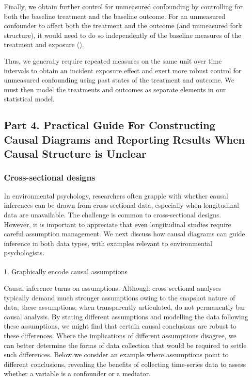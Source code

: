 \documentclass[
  singlecolumn]{article}
\makeatletter
\let\oldparagraph\paragraph
\renewcommand{\paragraph}{
    \@ifstar
      \xxxParagraphStar
      \xxxParagraphNoStar
  }
\newcommand{\xxxParagraphStar}[1]{\oldparagraph*{#1}\mbox{}}
\newcommand{\xxxParagraphNoStar}[1]{\oldparagraph{#1}\mbox{}}
\makeatother
\begin{document}
Finally, we obtain further control for unmeasured confounding by
controlling for both the baseline treatment and the baseline outcome.
For an unmeasured confounder to affect both the treatment and the
outcome (and unmeasured fork structure), it would need to do so
independently of the baseline measures of the treatment and exposure
().

Thus, we generally require repeated measures on the same unit over time
intervals to obtain an incident exposure effect and exert more robust
control for unmeasured confounding using past states of the treatment
and outcome. We must then model the treatments and outcomes as separate
elements in our statistical model.

\subsection{Part 4. Practical Guide For Constructing Causal Diagrams and
Reporting Results When Causal Structure is Unclear}\label{section-part4}

\subsubsection{Cross-sectional designs}\label{cross-sectional-designs}

In environmental psychology, researchers often grapple with whether
causal inferences can be drawn from cross-sectional data, especially
when longitudinal data are unavailable. The challenge is common to
cross-sectional designs. However, it is important to appreciate that
even longitudinal studies require careful assumption management. We next
discuss how causal diagrams can guide inference in both data types, with
examples relevant to environmental psychologists.

\paragraph{1. Graphically encode causal
assumptions}\label{graphically-encode-causal-assumptions}

Causal inference turns on assumptions. Although cross-sectional analyses
typically demand much stronger assumptions owing to the snapshot nature
of data, these assumptions, when transparently articulated, do not
permanently bar causal analysis. By stating different assumptions and
modelling the data following these assumptions, we might find that
certain causal conclusions are robust to these differences. Where the
implications of different assumptions disagree, we can better determine
the forms of data collection that would be required to settle such
differences. Below we consider an example where assumptions point to
different conclusions, revealing the benefits of collecting time-series
data to assess whether a variable is a confounder or a mediator.
\end{document}
